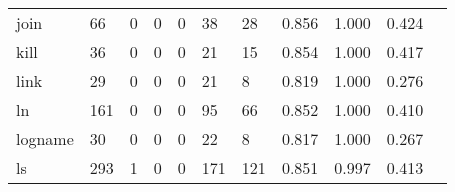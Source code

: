 \begin{longtable}{lp{1.20cm}p{1.20cm}p{1.20cm}p{1.20cm}p{1.20cm}p{1.20cm}p{1.20cm}p{1.20cm}p{1.20cm}p{1.20cm}}
join      &                                    66 &                                                  0 &                                                  0 &                                                  0 &                                                 38 &                                                 28 &                                         0.856 &                                              1.000 &                                              0.424 \\
kill      &                                    36 &                                                  0 &                                                  0 &                                                  0 &                                                 21 &                                                 15 &                                         0.854 &                                              1.000 &                                              0.417 \\
link      &                                    29 &                                                  0 &                                                  0 &                                                  0 &                                                 21 &                                                  8 &                                         0.819 &                                              1.000 &                                              0.276 \\
ln        &                                   161 &                                                  0 &                                                  0 &                                                  0 &                                                 95 &                                                 66 &                                         0.852 &                                              1.000 &                                              0.410 \\
logname   &                                    30 &                                                  0 &                                                  0 &                                                  0 &                                                 22 &                                                  8 &                                         0.817 &                                              1.000 &                                              0.267 \\
ls        &                                   293 &                                                  1 &                                                  0 &                                                  0 &                                                171 &                                                121 &                                         0.851 &                                              0.997 &                                              0.413 \\

\end{longtable}
